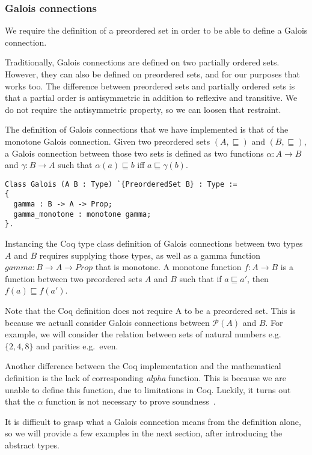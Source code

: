 \subsubsection{Galois connections}
We require the definition of a preordered set in order to be able to define a
Galois connection.

Traditionally, Galois connections are defined on two partially ordered sets.
However, they can also be defined on preordered sets, and for our purposes that
works too. The difference between preordered sets and partially ordered sets is
that a partial order is antisymmetric in addition to reflexive and transitive.
We do not require the antisymmetric property, so we can loosen that restraint.

The definition of Galois connections that we have implemented is that of the
monotone Galois connection. Given two preordered sets $(A,\sqsubseteq)$ and
$(B,\sqsubseteq)$, a Galois connection between those two sets is defined as two
functions $\alpha : A \rightarrow B$ and $\gamma : B \rightarrow A$ such 
that $\alpha(a)
\sqsubseteq b$ iff $a \sqsubseteq \gamma(b)$.

\begin{verbatim}
Class Galois (A B : Type) `{PreorderedSet B} : Type :=
{
  gamma : B -> A -> Prop;
  gamma_monotone : monotone gamma;
}.
\end{verbatim}

Instancing the Coq type class definition of Galois connections between two
types $A$ and $B$ requires supplying those types, as well as a gamma function
$gamma : B \rightarrow A \rightarrow Prop$ that is monotone. 
A monotone function $f : A \rightarrow B$ is
a function between two preordered sets $A$ and $B$ such that if $a \sqsubseteq
a'$, then $f(a) \sqsubseteq f(a')$.

Note that the Coq definition does not require A to be a preordered set. This is
because we actuall consider Galois connections between $\mathcal{P}(A)$ and
$B$. For example, we will consider the relation between sets of natural numbers
e.g.\ $\{2, 4, 8\}$ and parities e.g.\ even.

Another difference between the Coq implementation and the mathematical
definition is the lack of corresponding \textit{alpha} function. This is
because we are unable to define this function, due to limitations in Coq.
Luckily, it turns out that the $\alpha$ function is not necessary to prove
soundness~\cite{jourdan2016verasco}.

It is difficult to grasp what a Galois connection means from the definition
alone, so we will provide a few examples in the next section, after
introducing the abstract types.

